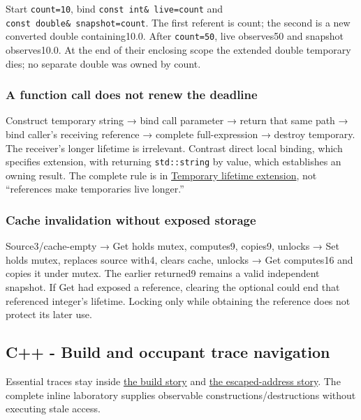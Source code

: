 Start \texttt{count=10}, bind \texttt{const\ int\&\ live=count} and \texttt{const\ double\&\ snapshot=count}. The first referent is count; the second is a new converted double containing10.0. After \texttt{count=50}, live observes50 and snapshot observes10.0. At the end of their enclosing scope the extended double temporary dies; no separate double was owned by count.

\subsubsection{A function call does not renew the deadline}\label{appendix-92ff77d4dfdc-a-function-call-does-not-renew-the-deadline}

Construct temporary string → bind call parameter → return that same path → bind caller's receiving reference → complete full-expression → destroy temporary. The receiver's longer lifetime is irrelevant. Contrast direct local binding, which specifies extension, with returning \texttt{std::string} by value, which establishes an owning result. The complete rule is in \hyperref[appendix-a978b29bbbb0]{Temporary lifetime extension}, not ``references make temporaries live longer.''

\subsubsection{Cache invalidation without exposed storage}\label{appendix-92ff77d4dfdc-cache-invalidation-without-exposed-storage}

Source3/cache-empty → Get holds mutex, computes9, copies9, unlocks → Set holds mutex, replaces source with4, clears cache, unlocks → Get computes16 and copies it under mutex. The earlier returned9 remains a valid independent snapshot. If Get had exposed a reference, clearing the optional could end that referenced integer's lifetime. Locking only while obtaining the reference does not protect its later use.

\subsection{C++ - Build and occupant trace navigation}\label{appendix-92ff77d4dfdc-c---build-and-occupant-trace-navigation}

Essential traces stay inside \hyperref[01-foundations-i-ch003-following-one-call-through-the-build]{the build story} and \hyperref[01-foundations-i-ch003-following-an-escaped-address-through-time]{the escaped-address story}. The complete inline laboratory supplies observable constructions/destructions without executing stale access.

